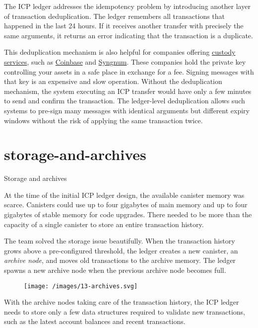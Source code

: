 \documentclass{article}
\begin{document}
The ICP ledger addresses the idempotency problem by introducing another layer of transaction deduplication.
The ledger remembers all transactions that happened in the last 24 hours.
If it receives another transfer with precisely the same arguments, it returns an error indicating that the transaction is a duplicate.

This deduplication mechanism is also helpful for companies offering \href{https://www.coindesk.com/learn/what-is-crypto-custody/}{custody services}, such as \href{https://www.coinbase.com}{Coinbase} and \href{https://www.sygnum.com}{Syngnum}.
These companies hold the private key controlling your assets in a safe place in exchange for a fee.
Signing messages with that key is an expensive and slow operation.
Without the deduplication mechanism, the system executing an ICP transfer would have only a few minutes to send and confirm the transaction.
The ledger-level deduplication allows such systems to pre-sign many messages with identical arguments but different expiry windows without the risk of applying the same transaction twice.

\section{storage-and-archives}{Storage and archives}

At the time of the initial ICP ledger design, the available canister memory was scarce.
Canisters could use up to four gigabytes of main memory and up to four gigabytes of stable memory for code upgrades.
There needed to be more than the capacity of a single canister to store an entire transaction history.

The team solved the storage issue beautifully.
When the transaction history grows above a pre-configured threshold, the ledger creates a new canister, an \emph{archive node}, and moves old transactions to the archive memory.
The ledger spawns a new archive node when the previous archive node becomes full.

\begin{figure}[grayscale-diagram]
  \texttt{[image: /images/13-archives.svg]}
\end{figure}

With the archive nodes taking care of the transaction history, the ICP ledger needs to store only a few data structures required to validate new transactions, such as the latest account balances and recent transactions.
\end{document}
